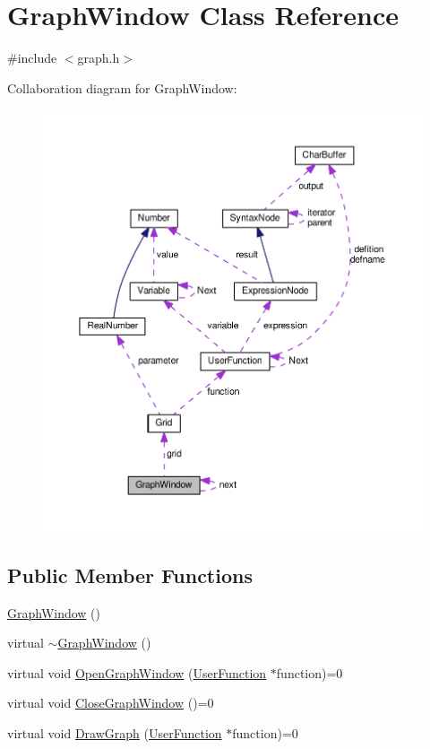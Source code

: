 \hypertarget{classGraphWindow}{}\section{Graph\+Window Class Reference}
\label{classGraphWindow}


{\ttfamily \#include $<$graph.\+h$>$}



Collaboration diagram for Graph\+Window\+:\nopagebreak
\begin{figure}[H]
\begin{center}
\leavevmode
\includegraphics[width=350pt]{classGraphWindow__coll__graph}
\end{center}
\end{figure}
\subsection*{Public Member Functions}
\begin{DoxyCompactItemize}
\item 
\hyperlink{classGraphWindow_ab8ca84cf6fe5a68e7fb87b7f47636d7d}{Graph\+Window} ()
\item 
virtual \hyperlink{classGraphWindow_acca1dc8c3eefe6608ae2de3cee2e22ee}{$\sim$\+Graph\+Window} ()
\item 
virtual void \hyperlink{classGraphWindow_a63309cbe3e1989d9eac566372dc888e8}{Open\+Graph\+Window} (\hyperlink{classUserFunction}{User\+Function} $\ast$function)=0
\item 
virtual void \hyperlink{classGraphWindow_a8d4db6854a2eb91d5e04fdc91918b56b}{Close\+Graph\+Window} ()=0
\item 
virtual void \hyperlink{classGraphWindow_a476a4a268feb290df84b6dc4eeac8af2}{Draw\+Graph} (\hyperlink{classUserFunction}{User\+Function} $\ast$function)=0
\end{DoxyCompactItemize}
